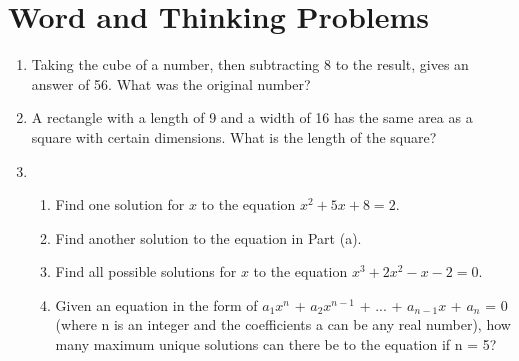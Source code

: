 \documentclass{article}
\begin{document}
\section{Word and Thinking Problems}
\begin{enumerate}
    \itemsep1.5em
    
    \item {Taking the cube of a number, then subtracting 8 to the result, gives an answer of 56. What was the original number?}
    
    \item {A rectangle with a length of 9 and a width of 16 has the same area as a square with certain dimensions. What is the length of the square?}
    
    \item
    \begin{enumerate}
        \itemsep2.0em
        \item {Find one solution for $x$ to the equation {$x^2 + 5x + 8 = 2$}.}
        
        \item {Find another solution to the equation in Part (a).}
        
        \item {Find all possible solutions for $x$ to the equation {$x^3 + 2x^2 - x - 2 = 0$}.}
        
        \item {Given an equation in the form of {$a_{1}x^n$ + $a_{2}x^{n-1}$ + ... + $a_{n-1}x$ + $a_{n}$ = 0 (where {n} is an integer and the coefficients {a} can be any real number), how many maximum unique solutions can there be to the equation if n = 5?}}
        
    \end{enumerate}
    
\end{enumerate}
\end{document}
